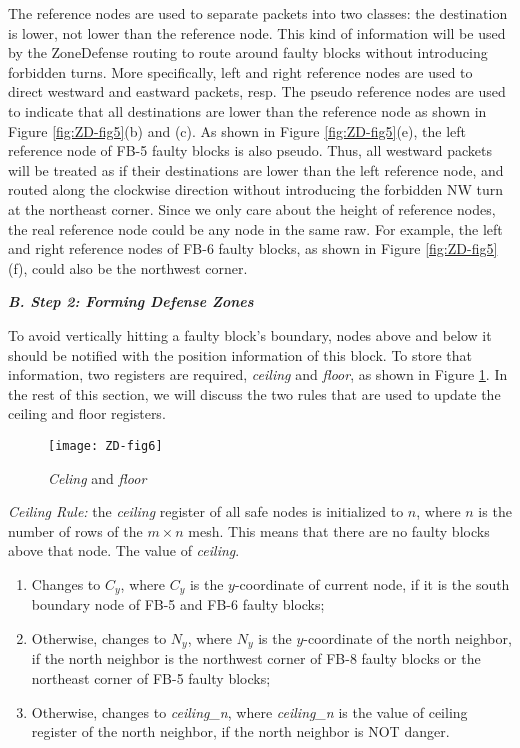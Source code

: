 The reference nodes are used to separate packets into two classes: the destination is {lower, not lower} than the reference node. This kind of information will be used by the ZoneDefense routing to route around faulty blocks without introducing forbidden turns. More specifically, left and right reference nodes are used to direct westward and eastward packets, resp. The pseudo reference nodes are used to indicate that all destinations are lower than the reference node as shown in Figure \ref{fig:ZD-fig5}(b) and (c). As shown in Figure \ref{fig:ZD-fig5}(e), the left reference node of FB-5 faulty blocks is also pseudo. Thus, all westward packets will be treated as if their destinations are lower than the left reference node, and routed along the clockwise direction without introducing the forbidden NW turn at the northeast corner. Since we only care about the height of reference nodes, the real reference node could be any node in the same raw. For example, the left and right reference nodes of FB-6 faulty blocks, as shown in Figure \ref{fig:ZD-fig5}(f), could also be the northwest corner.

\textbf\textit{B. Step 2: Forming Defense Zones}

To avoid vertically hitting a faulty block’s boundary, nodes above and below it should be notified with the position information of this block. To store that information, two registers are required, \textit{ceiling} and \textit{floor}, as shown in Figure \ref{fig:ZD-fig6}. In the rest of this section, we will discuss the two rules that are used to update the ceiling and floor registers.
\begin{figure}[h]
    \centering
        \texttt{[image: ZD-fig6]}
          \caption{\textit{Celing} and \textit{floor}}
        \label{fig:ZD-fig6}
\end{figure}


\textit{Ceiling Rule:} the \textit{ceiling} register of all safe nodes is initialized to $n$, where $n$ is the number of rows of the $m \times n$ mesh. This means that there are no faulty blocks above that node. The value of \textit{ceiling}.

\begin{enumerate}[1)]
    \item Changes to $C_{y}$, where $C_{y}$ is the $y$-coordinate of current node, if it is the south boundary node of FB-5 and FB-6 faulty blocks;

    \item Otherwise, changes to $N_{y}$, where $N_{y}$ is the $y$-coordinate of the north neighbor, if the north neighbor is the northwest corner of FB-8 faulty blocks or the northeast corner of FB-5 faulty blocks;

    \item Otherwise, changes to \textit{ceiling\_n}, where \textit{ceiling\_n} is the value of ceiling register of the north neighbor, if the north neighbor is NOT danger.
\end{enumerate}

